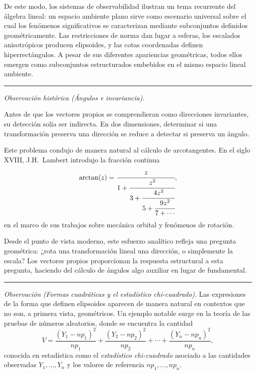 \medskip

De este modo, los sistemas de observabilidad ilustran un tema recurrente del
álgebra lineal: un espacio ambiente plano sirve como escenario universal sobre
el cual los fenómenos significativos se caracterizan mediante subconjuntos
definidos geométricamente.
Las restricciones de norma dan lugar a esferas, los escalados anisotrópicos
producen elipsoides, y las cotas coordenadas definen hiperrectángulos.
A pesar de sus diferentes apariencias geométricas, todos ellos emergen como
subconjuntos estructurados embebidos en el mismo espacio lineal ambiente.

\bigskip
\hrule
\medskip


\textit{Observación histórica (Ángulos e invariancia).}

Antes de que los vectores propios se comprendieran como direcciones invariantes,
su detección solía ser indirecta.
En dos dimensiones, determinar si una transformación preserva una dirección se
reduce a detectar si preserva un ángulo.

\medskip

Este problema condujo de manera natural al cálculo de arcotangentes.
En el siglo XVIII, J.H.~Lambert introdujo la fracción continua
\[
\arctan(z)
=
\cfrac{z}{1 + \cfrac{z^2}{3 + \cfrac{4z^2}{5 + \cfrac{9z^2}{7 + \cdots}}}},
\]
en el marco de sus trabajos sobre mecánica orbital y fenómenos de rotación.

\medskip

Desde el punto de vista moderno, este esfuerzo analítico refleja una pregunta
geométrica: ¿rota una transformación lineal una dirección, o simplemente la
escala?
Los vectores propios proporcionan la respuesta estructural a esta pregunta,
haciendo del cálculo de ángulos algo auxiliar en lugar de fundamental.

\medskip
\hrule
\bigskip

\textit{Observación (Formas cuadráticas y el estadístico chi-cuadrado).}
Las expresiones de la forma que definen elipsoides aparecen de manera natural
en contextos que no son, a primera vista, geométricos.
Un ejemplo notable surge en la teoría de las pruebas de números aleatorios,
donde se encuentra la cantidad
\[
V
=
\frac{(Y_1 - np_1)^2}{np_1}
+
\frac{(Y_2 - np_2)^2}{np_2}
+
\cdots
+
\frac{(Y_n - np_n)^2}{np_n},
\]
conocida en estadística como el \emph{estadístico chi-cuadrado} asociado a
las cantidades observadas $Y_1,\dots,Y_n$ y los valores de referencia
$np_1,\dots,np_n$.

